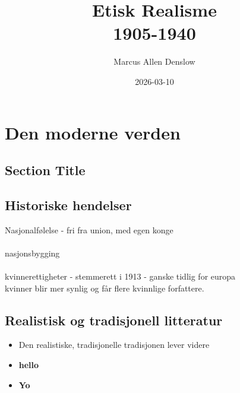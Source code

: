 \documentclass{report}
\title{\Huge{Etisk Realisme}\\ 1905-1940}
\author{\Huge{Marcus Allen Denslow}}
\date{2026-03-10}
\begin{document}
\maketitle
\newpage%
\tableofcontents
\pagebreak

\chapter{Den moderne verden}
\section{Section Title}

\section{Historiske hendelser} 
Nasjonalfølelse - fri fra union, med egen konge \\ \\
nasjonsbygging \\ \\
kvinnerettigheter - stemmerett i 1913 - ganske tidlig for europa \\ kvinner blir mer synlig og får flere kvinnlige forfattere.


\section{Realistisk og tradisjonell litteratur} 
\begin{itemize}
    \item Den realistiske, tradisjonelle tradisjonen lever videre
\end{itemize}

\begin{itemize}
    \item  \textbf{hello}
        \item \textbf{Yo}
\end{itemize}
\end{document}
